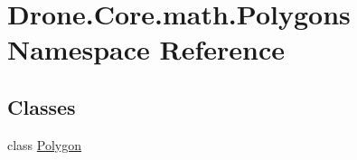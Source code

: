 \hypertarget{namespace_drone_1_1_core_1_1math_1_1_polygons}{}\section{Drone.\+Core.\+math.\+Polygons Namespace Reference}
\label{namespace_drone_1_1_core_1_1math_1_1_polygons}
\subsection*{Classes}
\begin{DoxyCompactItemize}
\item 
class \hyperlink{class_drone_1_1_core_1_1math_1_1_polygons_1_1_polygon}{Polygon}
\end{DoxyCompactItemize}
